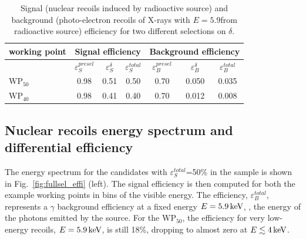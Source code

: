 \begin{table}[t]

\caption{Signal (nuclear recoils induced by \ambe radioactive source) and background (photo-electron recoils of X-rays
         with $E=5.9$\keV from \fe radioactive source) efficiency for
         two different selections on $\delta$.\label{tab:roc}}

\vspace{10pt}
\normalsize
\centering
\begin{tabular}{l c c c | c c c }
  \hline\hline
  working point & \multicolumn{3}{c}{Signal efficiency} & \multicolumn{3}{c}{Background efficiency} \\
  \hline
  & $\varepsilon_{S}^{presel}$ & $\varepsilon_{S}^{\delta}$ & $\varepsilon_{S}^{total}$ & $\varepsilon_{B}^{presel}$ & $\varepsilon_{B}^{\delta}$ & $\varepsilon_{B}^{total}$ \\
  \hline
  $\mathrm{WP}_{50}$  & 0.98                        & 0.51                      & 0.50                     & 0.70                     & 0.050                     & 0.035 \\
  $\mathrm{WP}_{40}$  & 0.98                        & 0.41                      & 0.40                     & 0.70                     & 0.012                     & 0.008 \\
  \hline\hline
\end{tabular}
\end{table}



\subsection{Nuclear recoils energy spectrum and differential efficiency}

The energy spectrum for the candidates with
$\varepsilon_{S}^{total}$=50\% in the \ambe sample is shown in
Fig.~\ref{fig:fullsel_effi} (left).  The signal efficiency is then
computed for both the example working points in bins of the visible
energy. The efficiency, $\varepsilon_{B}^{total}$, represents a
$\gamma$ background efficiency at a fixed energy $E=5.9\,\textrm{ke\hspace{-.08em}V}$, \ie, the
energy of the photons emitted by the \fe source. For the
$\mathrm{WP}_{50}$, the efficiency for very low-energy recoils,
$E=5.9\,\textrm{ke\hspace{-.08em}V}$, is still 18\%, dropping to almost zero at
$E\lesssim4\,\textrm{ke\hspace{-.08em}V}$.

